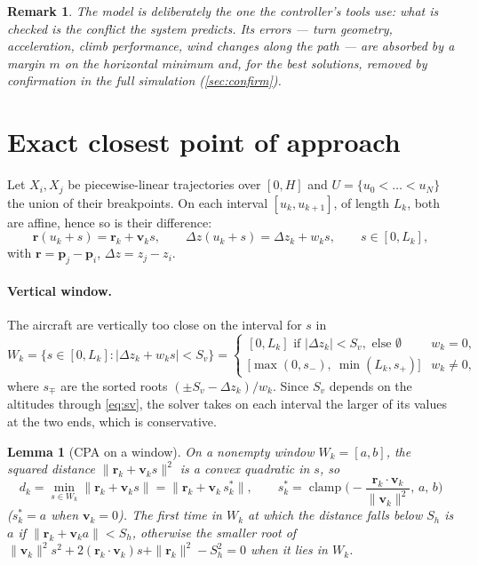 \documentclass[11pt,a4paper]{article}
\newtheorem{lemma}{Lemma}
\newtheorem{remark}{Remark}
\newcommand{\clamp}{\operatorname{clamp}}
\newcommand{\Sh}{S_h}
\newcommand{\Sv}{S_v}
\begin{document}
\begin{remark}
The model is deliberately the one the controller's tools use: what is checked is the conflict the system predicts.
Its errors --- turn geometry, acceleration, climb performance, wind changes along the path --- are absorbed by a
margin $m$ on the horizontal minimum and, for the best solutions, removed by confirmation in the full simulation
(\cref{sec:confirm}).
\end{remark}

\section{Exact closest point of approach}\label{sec:cpa}

Let $X_i, X_j$ be piecewise-linear trajectories over $[0,H]$ and $U = \{u_0<\dots<u_N\}$ the union of their
breakpoints. On each interval $[u_k,u_{k+1}]$, of length $L_k$, both are affine, hence so is their difference:
\begin{equation}
\bm r(u_k+s) = \bm r_k + \bm v_k s,\qquad \Delta z(u_k+s) = \Delta z_k + w_k s,\qquad s\in[0,L_k],
\end{equation}
with $\bm r=\bm p_j-\bm p_i$, $\Delta z = z_j - z_i$.

\paragraph{Vertical window.} The aircraft are vertically too close on the interval for $s$ in
\begin{equation}
W_k = \{s\in[0,L_k] : |\Delta z_k + w_k s| < \Sv\} =
\begin{cases}
[0,L_k] \text{ if } |\Delta z_k| < \Sv, \text{ else } \emptyset & w_k = 0,\\
\big[\max(0,s_-),\ \min(L_k,s_+)\big] & w_k\ne 0,
\end{cases}
\end{equation}
where $s_\mp$ are the sorted roots $(\pm\Sv - \Delta z_k)/w_k$. Since $\Sv$ depends on the altitudes through
\eqref{eq:sv}, the solver takes on each interval the larger of its values at the two ends, which is conservative.

\begin{lemma}[CPA on a window]\label{lem:cpa}
On a nonempty window $W_k=[a,b]$, the squared distance $\|\bm r_k+\bm v_k s\|^2$ is a convex quadratic in $s$, so
\begin{equation}
d_k = \min_{s\in W_k}\|\bm r_k + \bm v_k s\| = \big\|\bm r_k + \bm v_k\, s_k^*\big\|,\qquad
s_k^* = \clamp\!\Big(-\frac{\bm r_k\cdot\bm v_k}{\|\bm v_k\|^2},\, a,\, b\Big)
\end{equation}
($s_k^*=a$ when $\bm v_k = 0$). The first time in $W_k$ at which the distance falls below $\Sh$ is $a$ if
$\|\bm r_k + \bm v_k a\|<\Sh$, otherwise the smaller root of $\|\bm v_k\|^2 s^2 + 2(\bm r_k\cdot\bm v_k)s +
\|\bm r_k\|^2 - \Sh^2 = 0$ when it lies in $W_k$.
\end{lemma}
\end{document}
